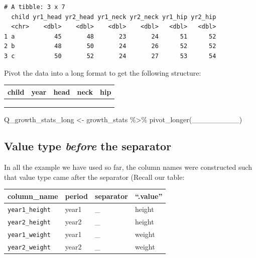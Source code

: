 \documentclass[
  letterpaper,
  DIV=11,
  numbers=noendperiod]{scrreprt}
\newenvironment{Shaded}{\begin{snugshade}}{\end{snugshade}}
\newcommand{\FunctionTok}[1]{\textcolor[rgb]{0.28,0.35,0.67}{#1}}
\newcommand{\NormalTok}[1]{\textcolor[rgb]{0.00,0.23,0.31}{#1}}
\newcommand{\OtherTok}[1]{\textcolor[rgb]{0.00,0.23,0.31}{#1}}
\newcommand{\SpecialCharTok}[1]{\textcolor[rgb]{0.37,0.37,0.37}{#1}}
\begin{document}
\begin{tcolorbox}
\begin{verbatim}
# A tibble: 3 x 7
  child yr1_head yr2_head yr1_neck yr2_neck yr1_hip yr2_hip
  <chr>    <dbl>    <dbl>    <dbl>    <dbl>   <dbl>   <dbl>
1 a           45       48       23       24      51      52
2 b           48       50       24       26      52      52
3 c           50       52       24       27      53      54
\end{verbatim}

Pivot the data into a long format to get the following structure:

\begin{longtable}[]{@{}lllll@{}}
\toprule\noalign{}
child & year & head & neck & hip \\
\midrule\noalign{}
\endhead
\bottomrule\noalign{}
\endlastfoot
& & & & \\
& & & & \\
& & & & \\
\end{longtable}

\begin{Shaded}
\begin{Highlighting}[]
\NormalTok{Q\_growth\_stats\_long }\OtherTok{\textless{}{-}}
\NormalTok{  growth\_stats }\SpecialCharTok{\%\textgreater{}\%}
  \FunctionTok{pivot\_longer}\NormalTok{(\_\_\_\_\_\_\_\_\_)}
\end{Highlighting}
\end{Shaded}

\end{tcolorbox}

\hypertarget{value-type-before-the-separator}{%
\subsection{\texorpdfstring{Value type \emph{before} the
separator}{Value type before the separator}}\label{value-type-before-the-separator}}

In all the example we have used so far, the column names were
constructed such that value type came after the separator (Recall our
table:

\begin{longtable}[]{@{}llll@{}}
\toprule\noalign{}
column\_name & period & separator & ``.value'' \\
\midrule\noalign{}
\endhead
\bottomrule\noalign{}
\endlastfoot
\texttt{year1\_height} & year1 & \_ & height \\
\texttt{year2\_height} & year2 & \_ & height \\
\texttt{year1\_weight} & year1 & \_ & weight \\
\texttt{year2\_weight} & year2 & \_ & weight \\
\end{longtable}
\end{document}
